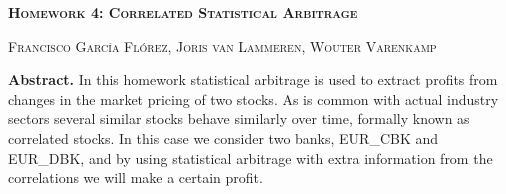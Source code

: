 \documentclass[8 pt]{article}
\begin{document}
\begin{minipage}{\textwidth}
    \centering
    \Large \textbf{\textsc{Homework 4: Correlated Statistical Arbitrage}}
    \vspace{0.5cm}

    \small \textsc{Francisco García Flórez, Joris van Lammeren, Wouter Varenkamp}
    \vspace{0.5cm}

    \begin{minipage}{0.8\textwidth}
      \textbf{Abstract.} In this homework statistical arbitrage is used to extract profits from changes in the market pricing of two stocks. As is common with actual industry sectors several similar stocks behave similarly over time, formally known as correlated stocks. In this case we consider two banks, EUR\_CBK and EUR\_DBK, and by using statistical arbitrage with extra information from the correlations we will make a certain profit.
    \end{minipage}
\end{minipage}

\vspace{0.5cm}
\end{document}

